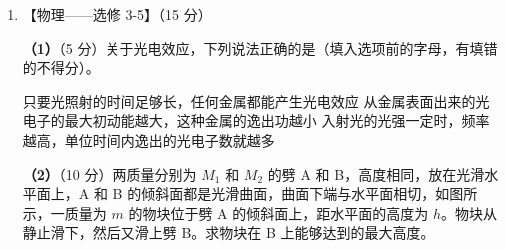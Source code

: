 \documentclass[\gkver]{gaokaozhenti}
\begin{document}
\begin{enumerate}
{由几何关系可知，在 D 点的入射角 $\theta=60^{\circ}$ ④。

设全反射的临界角为 $\theta_{c}$，则 $\sin\theta_{c}=\frac{1}{n}$ ⑤。

由⑤和已知条件得 $\theta_{c}=45^{\circ}$ ⑥。

因此，光在 D 点全反射。

设此光线的出射点为 E，由几何关系得 $\angle DEB=90^{\circ}$，$BD=a-2AF$ ⑦，$BE=BD\sin30^{\circ}$ ⑧。

联立③⑦⑧式得 $BE=\frac{1}{8}a$ ⑨。

即出射点在 BC 边上离 B 点 $\frac{1}{8}a$ 的位置。

}

\item
【物理——选修 3-5】（15 分）

\textbf{（1）}（5 分）关于光电效应，下列说法正确的是（填入选项前的字母，有填错的不得分）。

{只要光照射的时间足够长，任何金属都能产生光电效应}
{从金属表面出来的光电子的最大初动能越大，这种金属的逸出功越小}
{入射光的光强一定时，频率越高，单位时间内逸出的光电子数就越多}

\textbf{（2）}（10 分）两质量分别为 $M_{1}$ 和 $M_{2}$ 的劈 A 和 B，高度相同，放在光滑水平面上，A 和 B 的倾斜面都是光滑曲面，曲面下端与水平面相切，如图所示，一质量为 $m$ 的物块位于劈 A 的倾斜面上，距水平面的高度为 $h$。物块从静止滑下，然后又滑上劈 B。求物块在 B 上能够达到的最大高度。



\end{enumerate}
\end{document}
